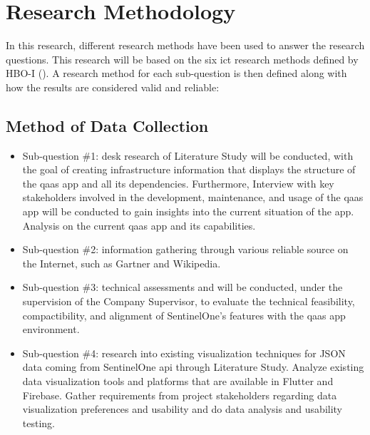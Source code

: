 \section{Research Methodology}
In this research, different research methods have been used to answer the research questions. This research
will be based on the six \acrshort{ict} research methods defined by HBO-I (\cite{ictresearchmethods}). A
research method for each sub-question is then defined along with how the results are considered valid and
reliable:
\subsection{Method of Data Collection}
\begin{itemize}[label=-]
      \item Sub-question \#1: desk research of Literature Study will be conducted, with the goal of creating
            infrastructure information that displays the structure of the \acrshort{qaas} app and all its
            dependencies. Furthermore, Interview with key stakeholders involved in the  development, maintenance,
            and usage of the \acrshort{qaas} app will be conducted to gain insights into the current situation
            of the app. Analysis on the current \acrshort{qaas} app and its capabilities.
      \item Sub-question \#2: information gathering through various reliable source on the Internet, such as
            Gartner and Wikipedia.
      \item Sub-question \#3: technical assessments and will be conducted, under the supervision of the Company
            Supervisor, to evaluate the technical feasibility, compactibility, and alignment of SentinelOne's
            features with the \acrshort{qaas} app environment.
      \item Sub-question \#4: research into existing visualization techniques for \gls{JSON} data coming from
            SentinelOne \acrshort{api} through Literature Study. Analyze existing data visualization tools and
            platforms that are available in Flutter and Firebase. Gather requirements from project stakeholders
            regarding data visualization preferences and usability and do data analysis and usability testing.

\end{itemize}
